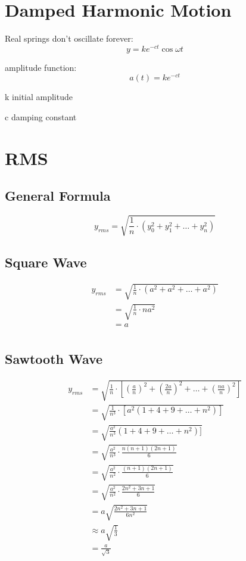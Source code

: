 \documentclass{exam}
\begin{document}
  \section{Damped Harmonic Motion}

  Real springs don't oscillate forever:
  \[
    y = k e^{-ct} \cos \omega t
  \]

  amplitude function:
  \[
    a(t) = k e^{-ct}
  \]

  \begin{description*}
    \item[k] initial amplitude
    \item[c] damping constant
  \end{description*}

  \section{RMS}

  \subsection{General Formula}
  \[
    y_{rms} = \sqrt{\frac{1}{n} \cdot \left( y_0^2 + y_1^2 + \ldots + y_n^2 \right) }
  \]

  \subsection{Square Wave}
  \begin{align*}
    y_{rms} & = \sqrt{\frac{1}{n} \cdot \left( a^2 + a^2 + \ldots + a^2 \right) } \\
            & = \sqrt{\frac{1}{n} \cdot na^2 } \\
            & = a \\
  \end{align*}

  \subsection{Sawtooth Wave}
  \begin{align*}
    y_{rms} & = \sqrt{\frac{1}{n} \cdot \left[ \left( \frac{a}{n} \right)^2 + \left( \frac{2a}{n} \right)^2 
        + \ldots + \left( \frac{na}{n} \right)^2 \right ] } \\
            & = \sqrt{\frac{1}{n^3} \cdot \left[ a^2 ( 1 + 4 + 9 + \dots + n^2 ) \right] } \\
            & = \sqrt{\frac{a^2}{n^3} ( 1 + 4 + 9 + \dots + n^2 ) ] } \\
            & = \sqrt{\frac{a^2}{n^3} \cdot \frac{n(n + 1)(2n + 1)}{6} } \\
            & = \sqrt{\frac{a^2}{n^2} \cdot \frac{(n + 1)(2n + 1)}{6} } \\
            & = \sqrt{\frac{a^2}{n^2} \cdot \frac{2n^2 + 3n + 1}{6} } \\
            & = a \sqrt{ \frac{2n^2 + 3n + 1}{6n^2} } \\
            & \approx a \sqrt{ \frac{1}{3} } \\
            & = \frac{a}{\sqrt{3}} \\
  \end{align*}
\end{document}
